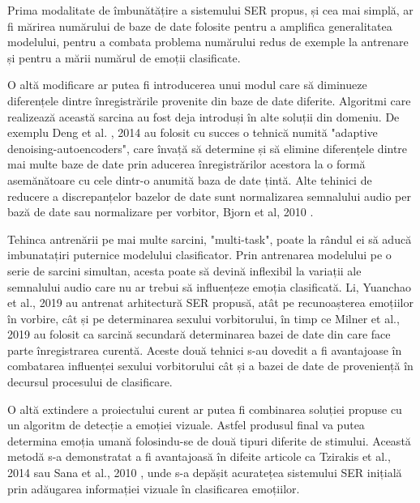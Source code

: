 \documentclass[a4paper,12pt]{book}
\begin{document}
		Prima modalitate de îmbunătățire a sistemului SER propus, și cea mai simplă, ar fi mărirea numărului de baze de date folosite pentru a amplifica generalitatea modelului, pentru a combata problema numărului redus de exemple la antrenare și pentru a mării numărul de emoții clasificate. \par 
		
		O altă modificare ar putea fi introducerea unui modul care să diminueze diferențele dintre înregistrările provenite din baze de date diferite. Algoritmi care realizează această sarcina au fost deja introduși în alte soluții din domeniu. De exemplu Deng et al. , 2014 \cite{imbun1} au folosit cu succes o tehnică numită "adaptive denoising-autoencoders", care învață să determine și să elimine diferențele dintre mai multe baze de date prin aducerea înregistrărilor acestora la o formă asemănătoare cu cele dintr-o anumită baza de date țintă. Alte tehinici de reducere a discrepanțelor bazelor de date sunt normalizarea semnalului audio per bază de date sau normalizare per vorbitor, Bjorn et al, 2010 \cite{spnorm}. \par
		Tehinca antrenării pe mai multe sarcini, "multi-task", poate la rândul ei să aducă imbunatațiri puternice modelului clasificator. Prin antrenarea modelului pe o serie de sarcini simultan, acesta poate să devină inflexibil la variații ale semnalului audio care nu ar trebui să influențeze emoția clasificată. Li, Yuanchao et al., 2019 \cite{yuan} au antrenat arhitectură SER propusă, atât pe recunoașterea emoțiilor în vorbire, cât și pe determinarea sexului vorbitorului, în timp ce Milner et al., 2019 \cite{multi-domain} au folosit ca sarcină secundară determinarea bazei de date din care face parte înregistrarea curentă. Aceste două tehnici s-au dovedit a fi avantajoase în combatarea influenței sexului vorbitorului cât și a bazei de date de proveniență în decursul procesului de clasificare.\par 
		O altă extindere a proiectului curent ar putea fi combinarea soluției propuse cu un algoritm de detecție a emoției vizuale. Astfel produsul final va putea determina emoția umană folosindu-se de două tipuri diferite de stimului. Această metodă s-a demonstratat a fi avantajoasă în difeite articole ca Tzirakis et al., 2014 \cite{tzir} sau Sana et al., 2010 \cite{imbun3}, unde s-a depășit acuratețea sistemului SER inițială prin adăugarea informației vizuale în clasificarea emoțiilor. \par		
		
\end{document}
